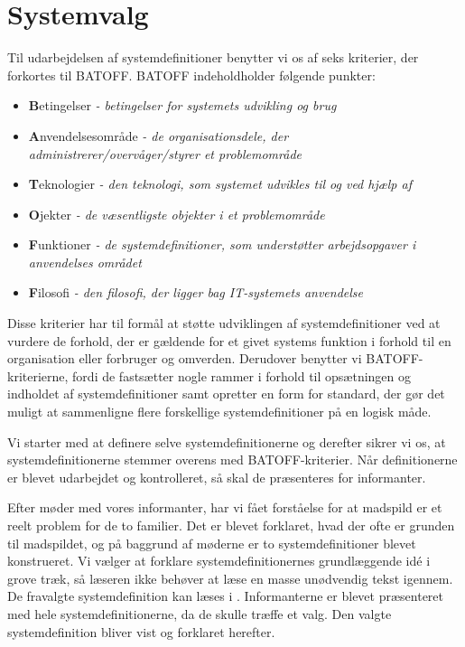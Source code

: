 \section{Systemvalg}
\label{sec:systemvalg}

Til udarbejdelsen af systemdefinitioner benytter vi os af seks kriterier, der forkortes til BATOFF. \cite[s.~37]{ooad} BATOFF indeholdholder følgende punkter: 

\begin{itemize}[noitemsep]
\item \textbf{B}etingelser \textit{- betingelser for systemets udvikling og brug}
\item \textbf{A}nvendelsesområde \textit{- de organisationsdele, der administrerer/overvåger/styrer et problemområde}
\item \textbf{T}eknologier \textit{- den teknologi, som systemet udvikles til og ved hjælp af}
\item \textbf{O}jekter \textit{- de væsentligste objekter i et problemområde}
\item \textbf{F}unktioner \textit{- de systemdefinitioner, som understøtter arbejdsopgaver i anvendelses området}
\item \textbf{F}ilosofi \textit{- den filosofi, der ligger bag IT-systemets anvendelse}
\end{itemize}

Disse kriterier har til formål at støtte udviklingen af systemdefinitioner ved at vurdere de forhold, der er gældende for et givet systems funktion i forhold til en organisation eller forbruger og omverden. Derudover benytter vi BATOFF-kriterierne, fordi de fastsætter nogle rammer i forhold til opsætningen og indholdet af systemdefinitioner samt opretter en form for standard, der gør det muligt at sammenligne flere forskellige systemdefinitioner på en logisk måde.

Vi starter med at definere selve systemdefinitionerne og derefter sikrer vi os, at systemdefinitionerne stemmer overens med BATOFF-kriterier. Når definitionerne er blevet udarbejdet og kontrolleret, så skal de præsenteres for informanter. 

Efter møder med vores informanter, har vi fået forståelse for at madspild er et reelt problem for de to familier. Det er blevet forklaret, hvad der ofte er grunden til madspildet, og på baggrund af møderne er to systemdefinitioner blevet konstrueret. Vi vælger at forklare systemdefinitionernes grundlæggende idé i grove træk, så læseren ikke behøver at læse en masse unødvendig tekst igennem. De fravalgte systemdefinition kan læses i . Informanterne er blevet præsenteret med hele systemdefinitionerne, da de skulle træffe et valg. Den valgte systemdefinition bliver vist og forklaret herefter.

